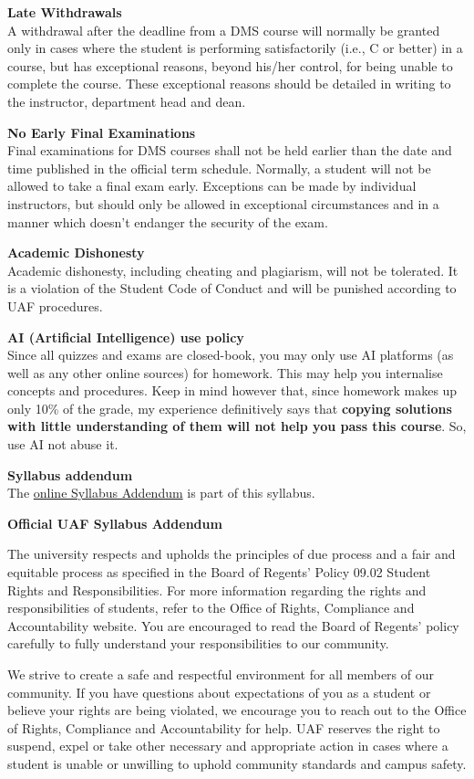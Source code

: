 \documentclass[12pt]{article}
\renewcommand{\emph}[1]{\textsf{\textbf{#1}}}
\newcommand{\localhead}[1]{\par\smallskip\textbf{#1}\nobreak\\}%
\def\subheading#1{\localhead{\emph{#1}}}
\begin{document}
\subheading{Late Withdrawals} 
A withdrawal after the deadline from a DMS course will normally be granted only in cases where the student is performing satisfactorily (i.e., C or better) in a course, but has exceptional reasons, beyond his/her control, for being unable to complete the course. These exceptional reasons should be detailed in writing to the instructor, department head and dean.

\subheading{No Early Final Examinations}
Final examinations for DMS courses shall not be held earlier than the date and time published in the official term schedule. Normally, a student will not be allowed to take a final exam early. Exceptions can be made by individual instructors, but should only be allowed in exceptional circumstances and in a manner which doesn't endanger the security of the exam.

\subheading{Academic Dishonesty}
Academic dishonesty, including cheating and plagiarism, will not be tolerated.  It is a violation of the Student Code of Conduct and will be punished according to UAF procedures.

\subheading{AI (Artificial Intelligence) use policy}
Since all quizzes and exams are closed-book, you may only use AI platforms (as well
as any other online sources) for homework. This may help you internalise concepts
and procedures. Keep in mind however that, since homework makes up only 10\% of
the grade, my experience definitively says that \textbf{copying solutions with little
understanding of them will not help you pass this course}. So, use AI not abuse it.

\subheading{Syllabus addendum}
The \href{https://drive.google.com/file/d/1dzZNW-DiD47BXhCc8_a6rbMGjvII53RI/view?usp=sharing}{online Syllabus Addendum} is part of this syllabus.
\begin{center}
    \textbf{\large{Official UAF Syllabus Addendum}}
    \end{center}
    
    
     The university respects and upholds the principles of due process and a fair and equitable process as specified in the Board of Regents' Policy 09.02 Student Rights and Responsibilities. For more information regarding the rights and responsibilities of students, refer to the Office of Rights, Compliance and Accountability website. You are encouraged to read the Board of Regents' policy carefully to fully understand your responsibilities to our community.
    
    We strive to create a safe and respectful environment for all members of our community. If you have questions about expectations of you as a student or believe your rights are being violated, we encourage you to reach out to the  Office of Rights, Compliance and Accountability for help. UAF reserves the right to suspend, expel or take other necessary and appropriate action in cases where a student is unable or unwilling to uphold community standards and campus safety.
    
\end{document}
